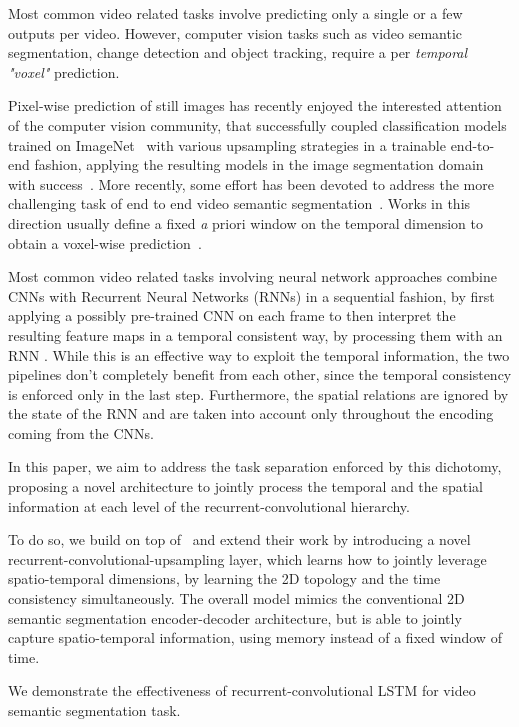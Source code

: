 Most common video related tasks involve predicting only a single or a few
outputs per video. However, computer vision tasks such as video semantic
segmentation, change detection and object tracking, require a per \emph{
temporal "voxel"} prediction.

Pixel-wise prediction of still images has recently enjoyed the interested
attention of the computer vision community, that successfully coupled
classification models trained on ImageNet~\citep{Szegedy15googlelenet,
Simonyan14vgg} with various upsampling strategies in a trainable end-to-end
fashion, applying the resulting models in the image segmentation domain with
success~\citep{long2014fully,noh2015learning}. More recently, some effort has
been devoted to address the more challenging task of end to end video semantic
segmentation~\citep{Tran16v2v}. Works in this direction usually define a fixed
{\emph a priori} window on the temporal dimension to obtain a voxel-wise
prediction~\citep{Tran16v2v}.

Most common video related tasks involving neural network approaches combine
CNNs with Recurrent Neural Networks (RNNs) in a sequential fashion, by first
applying a possibly pre-trained CNN on each frame to then interpret the
resulting feature maps in a temporal consistent way, by processing them with an
RNN \cite{}. While this is an effective way to exploit the temporal
information, the two pipelines don't completely benefit from each other, since
the temporal consistency is enforced only in the last step. Furthermore, the
spatial relations are ignored by the state of the RNN and are taken into
account only throughout the encoding coming from the CNNs.

In this paper, we aim to address the task separation enforced by this
dichotomy, proposing a novel architecture to jointly process the temporal and
the spatial information at each level of the recurrent-convolutional hierarchy.

To do so, we build on top of~\cite{ShiCWYWW15} and extend their work by
introducing a novel recurrent-convolutional-upsampling layer, which learns how
to jointly leverage spatio-temporal dimensions, by learning the 2D topology and
the time consistency simultaneously. The overall model mimics the conventional
2D semantic segmentation encoder-decoder architecture, but is able to jointly
capture spatio-temporal information, using memory instead of a fixed window of
time.

We demonstrate the effectiveness of recurrent-convolutional LSTM for video
semantic segmentation task.

